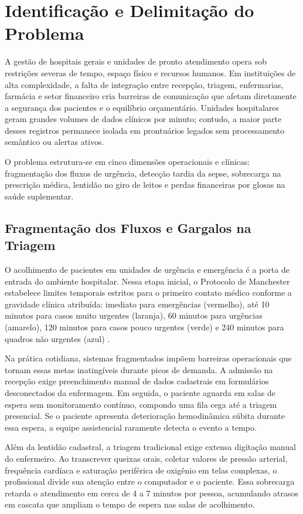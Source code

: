 \section{Identificação e Delimitação do Problema}
\label{sec:problema}

A gestão de hospitais gerais e unidades de pronto atendimento opera sob restrições severas de tempo, espaço físico e recursos humanos. Em instituições de alta complexidade, a falta de integração entre recepção, triagem, enfermarias, farmácia e setor financeiro cria barreiras de comunicação que afetam diretamente a segurança dos pacientes e o equilíbrio orçamentário. Unidades hospitalares geram grandes volumes de dados clínicos por minuto; contudo, a maior parte desses registros permanece isolada em prontuários legados sem processamento semântico ou alertas ativos.

O problema estrutura-se em cinco dimensões operacionais e clínicas: fragmentação dos fluxos de urgência, detecção tardia da sepse, sobrecarga na prescrição médica, lentidão no giro de leitos e perdas financeiras por glosas na saúde suplementar.

\subsection{Fragmentação dos Fluxos e Gargalos na Triagem}

O acolhimento de pacientes em unidades de urgência e emergência é a porta de entrada do ambiente hospitalar. Nessa etapa inicial, o Protocolo de Manchester estabelece limites temporais estritos para o primeiro contato médico conforme a gravidade clínica atribuída: imediato para emergências (vermelho), até 10 minutos para casos muito urgentes (laranja), 60 minutos para urgências (amarelo), 120 minutos para casos pouco urgentes (verde) e 240 minutos para quadros não urgentes (azul) \cite{manchester:2014}.

Na prática cotidiana, sistemas fragmentados impõem barreiras operacionais que tornam essas metas inatingíveis durante picos de demanda. A admissão na recepção exige preenchimento manual de dados cadastrais em formulários desconectados da enfermagem. Em seguida, o paciente aguarda em salas de espera sem monitoramento contínuo, compondo uma fila cega até a triagem presencial. Se o paciente apresenta deterioração hemodinâmica súbita durante essa espera, a equipe assistencial raramente detecta o evento a tempo.

Além da lentidão cadastral, a triagem tradicional exige extensa digitação manual do enfermeiro. Ao transcrever queixas orais, coletar valores de pressão arterial, frequência cardíaca e saturação periférica de oxigênio em telas complexas, o profissional divide sua atenção entre o computador e o paciente. Essa sobrecarga retarda o atendimento em cerca de 4 a 7 minutos por pessoa, acumulando atrasos em cascata que ampliam o tempo de espera nas salas de acolhimento.

